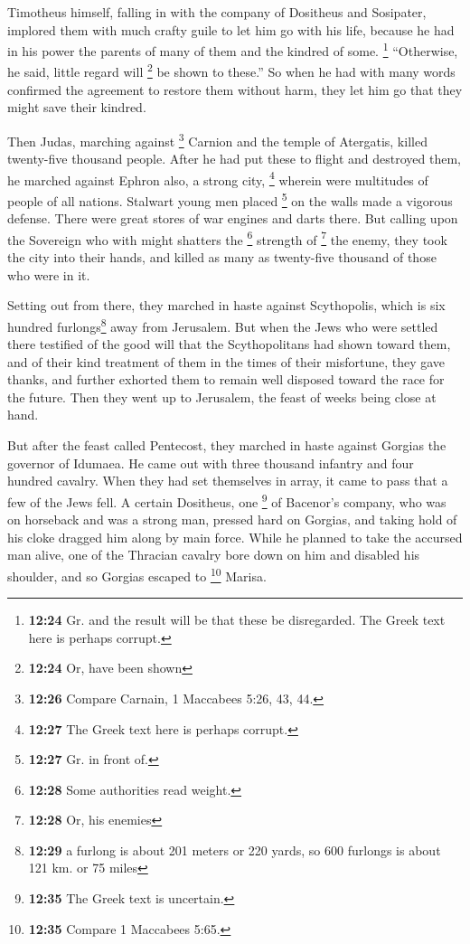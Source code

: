  Timotheus himself, falling in with the company of
Dositheus and Sosipater, implored them with much crafty guile to let him
go with his life, because he had in his power the parents of many of
them and the kindred of some. \footnote{\textbf{12:24} Gr. and the
  result will be that these be disregarded. The Greek text here is
  perhaps corrupt.} ``Otherwise, he said, little regard will \footnote{\textbf{12:24}
  Or, have been shown} be shown to these.''  So when he
had with many words confirmed the agreement to restore them without
harm, they let him go that they might save their kindred.

 Then Judas, marching against \footnote{\textbf{12:26}
  Compare Carnain, 1 Maccabees 5:26, 43, 44.} Carnion and the temple of
Atergatis, killed twenty-five thousand people.  After he
had put these to flight and destroyed them, he marched against Ephron
also, a strong city, \footnote{\textbf{12:27} The Greek text here is
  perhaps corrupt.} wherein were multitudes of people of all nations.
Stalwart young men placed \footnote{\textbf{12:27} Gr. in front of.} on
the walls made a vigorous defense. There were great stores of war
engines and darts there.  But calling upon the Sovereign
who with might shatters the \footnote{\textbf{12:28} Some authorities
  read weight.} strength of \footnote{\textbf{12:28} Or, his enemies}
the enemy, they took the city into their hands, and killed as many as
twenty-five thousand of those who were in it.

 Setting out from there, they marched in haste against
Scythopolis, which is six hundred furlongs\footnote{\textbf{12:29} a
  furlong is about 201 meters or 220 yards, so 600 furlongs is about 121
  km. or 75 miles} away from Jerusalem.  But when the
Jews who were settled there testified of the good will that the
Scythopolitans had shown toward them, and of their kind treatment of
them in the times of their misfortune,  they gave thanks,
and further exhorted them to remain well disposed toward the race for
the future. Then they went up to Jerusalem, the feast of weeks being
close at hand.

 But after the feast called Pentecost, they marched in
haste against Gorgias the governor of Idumaea.  He came
out with three thousand infantry and four hundred cavalry.
 When they had set themselves in array, it came to pass
that a few of the Jews fell.  A certain Dositheus, one
\footnote{\textbf{12:35} The Greek text is uncertain.} of Bacenor's
company, who was on horseback and was a strong man, pressed hard on
Gorgias, and taking hold of his cloke dragged him along by main force.
While he planned to take the accursed man alive, one of the Thracian
cavalry bore down on him and disabled his shoulder, and so Gorgias
escaped to \footnote{\textbf{12:35} Compare 1 Maccabees 5:65.} Marisa.

